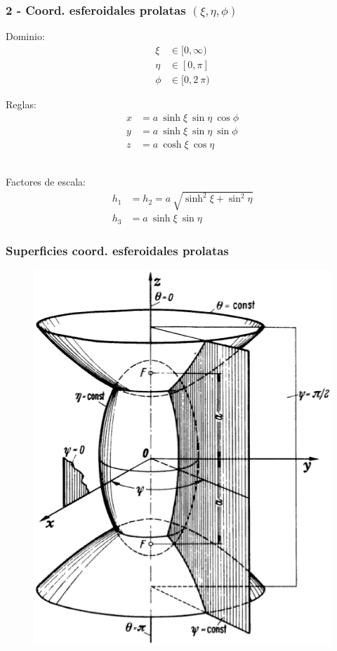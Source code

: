 \documentclass[12pt]{beamer}
\begin{document}
\begin{frame}
\frametitle{2 - Coord. esferoidales prolatas $(\xi, \eta, \phi)$}
\setlength{\abovedisplayskip}{-1pt}
\fontsize{12}{12}\selectfont
\begin{minipage}[t]{0.45\textwidth}
Dominio:
\begin{align*}
\xi &\in [0, \infty) \\
\eta &\in [0, \pi] \\
\phi &\in [0, 2 \: \pi)
\end{align*}
\end{minipage}
\hspace{1cm}
\pause
\begin{minipage}[t]{0.4\textwidth}
Reglas:
\begin{align*}
x &= a \: \sinh \xi \: \sin \eta \: \cos \phi\\
y &= a \: \sinh \xi \: \sin \eta \: \sin \phi\\
z &= a \: \cosh \xi \: \cos \eta
\end{align*}
\end{minipage}%
\\[1em]
\pause
Factores de escala:
\begin{align*}
h_{1} &= h_{2} = a \: \sqrt{\sinh^{2} \xi + \sin^{2} \eta} \\
h_{3 }&= a \: \sinh \xi \: \sin \eta
\end{align*}
\end{frame}
\begin{frame}
\frametitle{Superficies coord. esferoidales prolatas}
\begin{figure}[H]
  \centering
  \includegraphics[scale=0.3]{Imagenes/Sistema_Esfeoridal_Prolato.eps}
\end{figure}
\end{frame}
\end{document}

